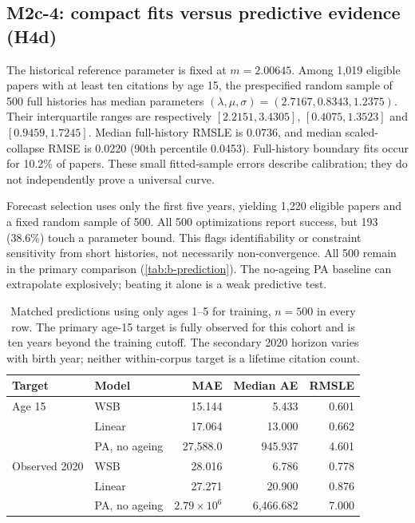 \subsection{M2c-4: compact fits versus predictive evidence (H4d)}
The historical reference parameter is fixed at $m=2.00645$. Among 1,019 eligible
papers with at least ten citations by age 15, the prespecified random sample of
500 full histories has median parameters
$(\lambda,\mu,\sigma)=(2.7167,0.8343,1.2375)$.
Their interquartile ranges are respectively $[2.2151,3.4305]$,
$[0.4075,1.3523]$ and $[0.9459,1.7245]$. Median full-history RMSLE is 0.0736,
and median scaled-collapse RMSE is 0.0220 (90th percentile 0.0453).
Full-history boundary fits occur for 10.2\% of papers. These small fitted-sample
errors describe calibration; they do not independently prove a universal curve.

Forecast selection uses only the first five years, yielding 1,220 eligible papers
and a fixed random sample of 500. All 500 optimizations report success, but
193 (38.6\%) touch a parameter bound. This flags identifiability or constraint
sensitivity from short histories, not necessarily non-convergence. All 500
remain in the primary comparison (\autoref{tab:b-prediction}). The no-ageing PA
baseline can extrapolate explosively; beating it alone is a weak predictive test.

\begin{table}[H]
\centering
\begin{tabular}{llrrr}
\toprule
Target & Model & MAE & Median AE & RMSLE\\
\midrule
Age 15 & WSB & 15.144 & 5.433 & 0.601\\
 & Linear & 17.064 & 13.000 & 0.662\\
 & PA, no ageing & 27,588.0 & 945.937 & 4.601\\
\midrule
Observed 2020 & WSB & 28.016 & 6.786 & 0.778\\
 & Linear & 27.271 & 20.900 & 0.876\\
 & PA, no ageing & $2.79\times10^6$ & 6,466.682 & 7.000\\
\bottomrule
\end{tabular}
\caption{Matched predictions using only ages 1--5 for training, $n=500$ in every
row. The primary age-15 target is fully observed for this cohort and is ten
years beyond the training cutoff. The secondary 2020 horizon varies with birth
year; neither within-corpus target is a lifetime citation count.}
\label{tab:b-prediction}
\end{table}

